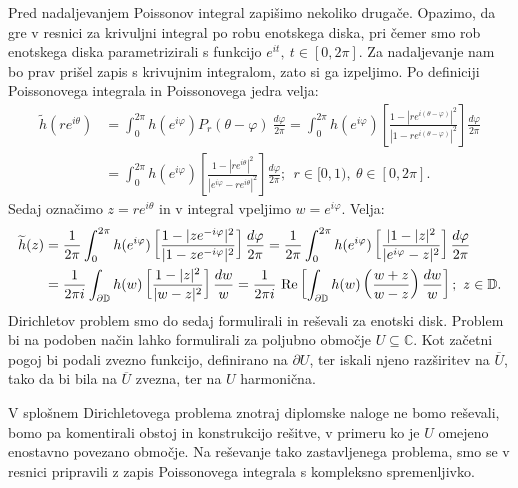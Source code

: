 \documentclass[mat1]{fmfdelo}
\begin{document}
    Pred nadaljevanjem Poissonov integral zapišimo nekoliko drugače. Opazimo, da gre v resnici za krivuljni integral po robu enotskega diska, pri čemer smo rob enotskega diska parametrizirali s funkcijo $e^{it},~t \in [0,2 \pi]$. 
    Za nadaljevanje nam bo prav prišel zapis s krivujnim integralom, zato si ga izpeljimo. Po definiciji Poissonovega integrala in Poissonovega jedra velja:
    \begin{align*}
        \widetilde{h}(r e^{i\theta}) &= \int_{0}^{2\pi}{h(e^{i\varphi}) P_r(\theta - \varphi)~\frac{d\varphi}{2 \pi}} = \int_{0}^{2\pi}{h(e^{i\varphi}) \left[\frac{1 - |r e^{i (\theta - \varphi)}|^2}{|1 - r e^{i (\theta - \varphi)}|^2}\right]\frac{d\varphi}{2 \pi}} \\
        & = \int_{0}^{2\pi}{h(e^{i\varphi}) \left[\frac{1 - |r e^{i \theta}|^2}{|e^{i \varphi} - r e^{i \theta}|^2}\right]\frac{d\varphi}{2 \pi}};~~ r \in [0,1),~\theta \in [0,2 \pi].
    \end{align*}
    Sedaj označimo $z = re^{i \theta}$ in v integral vpeljimo $w = e^{i \varphi}$. Velja:
    \begin{align}
        \label{pi_kompl}
        \widetilde{h}(z) &= \frac{1}{2 \pi}\int_{0}^{2\pi}{h(e^{i\varphi}) \left[\frac{1 - |ze^{ -i\varphi}|^2}{|1 - ze^{-i\varphi}|^2}\right]\frac{d\varphi}{2 \pi}}= \frac{1}{2\pi}\int_{0}^{2\pi}{h(e^{i\varphi}) \left[\frac{|1 - |z|^2}{|e^{i \varphi} - z|^2}\right]\frac{d\varphi}{2 \pi}} \notag \\
        & = \frac{1}{2\pi i}\int_{\partial \mathbb{D}}{h(w) \left[\frac{1 - |z|^2}{|w - z|^2}\right]\frac{dw}{w}} =  \frac{1}{2\pi i}~\text{Re}\left[\int_{\partial \mathbb{D}}{h(w) \left(\frac{w + z }{w - z}\right)\frac{dw}{w}}\right];~ z \in \mathbb{D}.
    \end{align}
    Dirichletov problem smo do sedaj formulirali in reševali za enotski disk. Problem bi na podoben način lahko formulirali za poljubno območje $U \subseteq \mathbb{C}$. 
    Kot začetni pogoj bi podali zvezno funkcijo, definirano na $\partial U$, ter iskali njeno razširitev na $\overline{U}$, tako da bi bila na $\overline{U}$ zvezna, ter na $U$ harmonična.
    
    V splošnem Dirichletovega problema znotraj diplomske naloge ne bomo reševali, bomo pa komentirali obstoj in konstrukcijo rešitve, v primeru ko je $U$ omejeno enostavno povezano območje.
    Na reševanje tako zastavljenega problema, smo se v resnici pripravili z zapis Poissonovega integrala s kompleksno spremenljivko.
\end{document}
